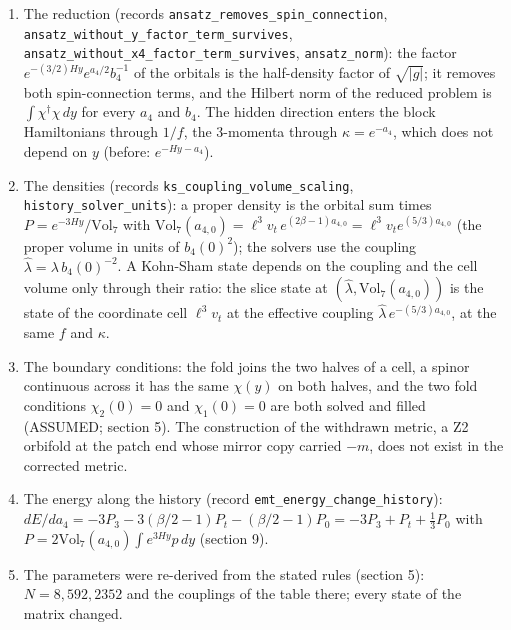 \documentclass[11pt]{article}
\begin{document}
\begin{enumerate}
\item The reduction (records \texttt{ansatz\_r\allowbreak{}emoves\_s\allowbreak{}pin\_conn\allowbreak{}ection}, \texttt{ansatz\_w\allowbreak{}ithout\_y\allowbreak{}\_factor\_\allowbreak{}term\_sur\allowbreak{}vives}, \texttt{ansatz\_w\allowbreak{}ithout\_x\allowbreak{}4\_factor\allowbreak{}\_term\_su\allowbreak{}rvives}, \texttt{ansatz\_n\allowbreak{}orm}): the factor $e^{-(3/2)Hy}e^{a_4/2}b_4^{-1}$ of the orbitals is the half-density factor of $\sqrt{|g|}$; it removes both spin-connection terms, and the Hilbert norm of the reduced problem is $\int\chi^\dagger\chi\,dy$ for every $a_4$ and $b_4$. The hidden direction enters the block Hamiltonians through $1/f$, the 3-momenta through $\kappa = e^{-a_4}$, which does not depend on $y$ (before: $e^{-Hy - a_4}$).
\item The densities (records \texttt{ks\_coupl\allowbreak{}ing\_volu\allowbreak{}me\_scali\allowbreak{}ng}, \texttt{history\_\allowbreak{}solver\_u\allowbreak{}nits}): a proper density is the orbital sum times $P = e^{-3Hy}/\mathrm{Vol}_7$ with $\mathrm{Vol}_7(a_{4,0}) = \ell^3v_t\,e^{(2\beta - 1)a_{4,0}} = \ell^3v_te^{(5/3)a_{4,0}}$ (the proper volume in units of $b_4(0)^2$); the solvers use the coupling $\hat\lambda = \lambda\,b_4(0)^{-2}$. A Kohn-Sham state depends on the coupling and the cell volume only through their ratio: the slice state at $(\hat\lambda, \mathrm{Vol}_7(a_{4,0}))$ is the state of the coordinate cell $\ell^3v_t$ at the effective coupling $\hat\lambda\,e^{-(5/3)a_{4,0}}$, at the same $f$ and $\kappa$.
\item The boundary conditions: the fold joins the two halves of a cell, a spinor continuous across it has the same $\chi(y)$ on both halves, and the two fold conditions $\chi_2(0) = 0$ and $\chi_1(0) = 0$ are both solved and filled (ASSUMED; section 5). The construction of the withdrawn metric, a Z2 orbifold at the patch end whose mirror copy carried $-m$, does not exist in the corrected metric.
\item The energy along the history (record \texttt{emt\_ener\allowbreak{}gy\_chang\allowbreak{}e\_histor\allowbreak{}y}): $dE/da_4 = -3P_3 - 3(\beta/2 - 1)P_t - (\beta/2 - 1)P_0 = -3P_3 + P_t + \tfrac13P_0$ with $P = 2\mathrm{Vol}_7(a_{4,0})\int e^{3Hy}p\,dy$ (section 9).
\item The parameters were re-derived from the stated rules (section 5): $N = 8, 592, 2352$ and the couplings of the table there; every state of the matrix changed.
\end{enumerate}
\end{document}
